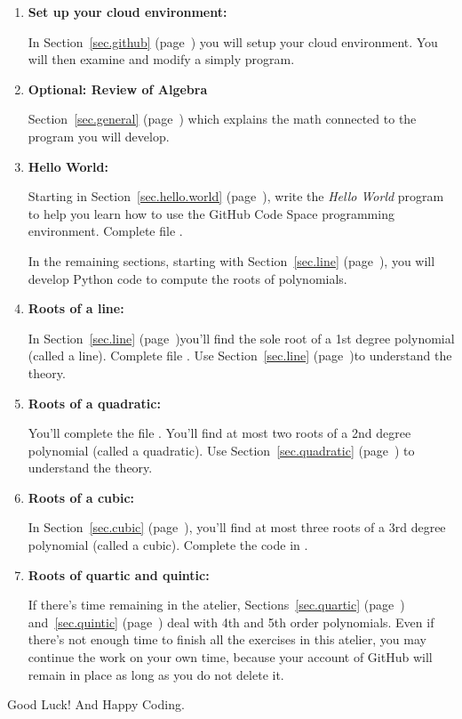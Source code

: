 \begin{enumerate}  

\item \textbf{Set up your cloud environment:}

  In Section~\ref{sec.github} (page~\pageref{sec.github}) you will setup your cloud environment. You
  will then examine and modify a simply  program.

\item \textbf{Optional: Review of Algebra}

  Section~\ref{sec.general} (page~\pageref{sec.general}) which explains the math
  connected to the program you will develop.

\item \textbf{Hello World:}

  Starting in Section~\ref{sec.hello.world} (page~\pageref{sec.hello.world}), write the
  \emph{Hello World} program to help you learn how to use the GitHub
  Code Space programming environment.  Complete file .

In the remaining sections, starting with Section~\ref{sec.line} (page~\pageref{sec.line}), you
will develop Python code to compute the roots of polynomials.  

\item \textbf{Roots of a line:}

  In Section~\ref{sec.line} (page~\pageref{sec.line})you'll find the sole root of a 1st
  degree polynomial (called a line).  Complete file .
  Use Section~\ref{sec.line} (page~\pageref{sec.line})to understand the theory.

\item \textbf{Roots of a quadratic:}

  You'll complete the file
  .  You'll find at most two roots of a 2nd degree
  polynomial (called a quadratic).  Use Section~\ref{sec.quadratic} (page~\pageref{sec.quadratic}) to
  understand the theory.

\item \textbf{Roots of a cubic:}

  In Section~\ref{sec.cubic} (page~\pageref{sec.cubic}), you'll find at most
  three roots of a 3rd degree polynomial (called a cubic).  Complete
  the code in .

\item \textbf{Roots of quartic and quintic:}

  If there's time remaining in the
  atelier, Sections~\ref{sec.quartic} (page~\pageref{sec.quartic}) and~\ref{sec.quintic} (page~\pageref{sec.quintic}) deal with
  4th and 5th order polynomials.  Even if there's not enough time to
  finish all the exercises in this atelier, you may continue the work
  on your own time, because your account of GitHub will remain in
  place as long as you do not delete it.
  
\end{enumerate}


Good Luck! And Happy Coding.


